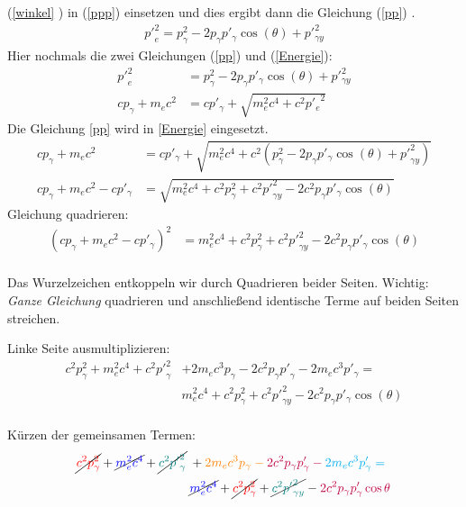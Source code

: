 (\ref{winkel} ) in (\ref{ppp}) einsetzen und dies ergibt dann die Gleichung  (\ref{pp}) .\\
\begin{align}
	{p'}_e^2=p_\gamma^2-2p_\gamma p'_\gamma \cos (\theta)+p'^2_{\gamma y}\label{pp}
\end{align}
Hier nochmals die zwei Gleichungen (\ref{pp}) und (\ref{Energie}):\\
\begin{align*}
	{p'}_e^2&=p_\gamma^2-2p_\gamma p'_\gamma \cos (\theta)+p'^2_{\gamma y}\\
	cp_\gamma+m_ec^2&=cp'_\gamma+\sqrt{m_e^2c^4+c^2{p'_e}^2} 
\end{align*}
Die Gleichung \ref{pp} wird in \ref{Energie} eingesetzt.\\
\begin{align*}
		cp_\gamma+m_ec^2&=cp'_\gamma+\sqrt{m_e^2c^4+c^2(p_\gamma^2-2p_\gamma p'_\gamma \cos (\theta)+{p'}^2_{\gamma y})} \\
	cp_\gamma+m_ec^2-cp'_\gamma&=\sqrt{m^2_ec^4+c^2p^2_\gamma+c^2{p'}^2_{\gamma y}-2c^2p_\gamma p'_\gamma \cos(\theta)}\
\end{align*}
Gleichung quadrieren:
\begin{align*}
		(cp_\gamma+m_ec^2-cp'_\gamma)^2&=m^2_ec^4+c^2p^2_\gamma+c^2{p'}^2_{\gamma y}-2c^2p_\gamma p'_\gamma \cos(\theta)\\
\end{align*}
\begin{DidaktikBox}
	Das Wurzelzeichen entkoppeln wir durch Quadrieren beider Seiten. 
	Wichtig: \emph{Ganze Gleichung} quadrieren und anschließend identische Terme 
	auf beiden Seiten streichen.
\end{DidaktikBox}


Linke Seite ausmultiplizieren:
\begin{align*}
	c^2p^2_\gamma+m_e^2c^4+c^2{p'}^2_\gamma&+2m_ec^3p_\gamma-  2c^2p_\gamma{p'}_\gamma-2m_ec^3p'_\gamma=\\
	&m^2_ec^4+c^2p^2_\gamma+c^2{p'}^2_{\gamma y}-2c^2p_\gamma p'_\gamma \cos(\theta)\\
\end{align*}

 Kürzen der gemeinsamen Termen:
\[
\begin{aligned}
	\cancel{\color{red}c^2 p_\gamma^2}
	+ \cancel{\color{blue}m_e^2 c^4}
	+ \cancel{\color{teal}c^2 {p'}_\gamma^2}	\;&
	+ \color{orange}2 m_e c^3 p_\gamma
	- \color{purple}2 c^2 p_\gamma p'_\gamma
	- \color{cyan}2 m_e c^3 p'_\gamma
	=\\[0.2em]
	\;&\cancel{\color{blue}m_e^2 c^4}
	+ \cancel{\color{red}c^2 p_\gamma^2}
	+ \cancel{\color{teal}c^2 {p'}_{\gamma y}^2}
	- \color{purple}2 c^2 p_\gamma p'_\gamma \cos\theta
\end{aligned}
\]



